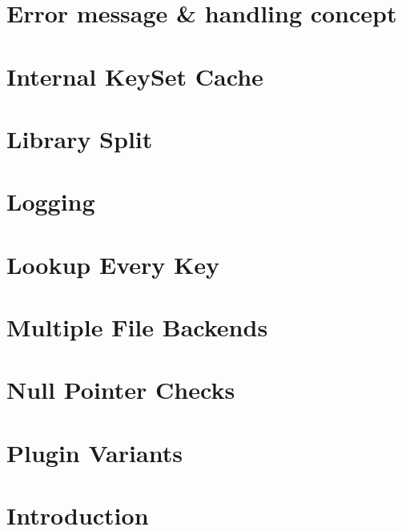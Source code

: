 \documentclass[twoside]{book}
\newcommand{\+}{\discretionary{\mbox{\scriptsize$\hookleftarrow$}}{}{}}
\begin{document}
\chapter{Error message \& handling concept}
\label{doc_decisions_ingroup_removal_md}

\chapter{Internal Key\+Set Cache}
\label{doc_decisions_internal_cache_md}

\chapter{Library Split}
\label{doc_decisions_library_split_md}

\chapter{Logging}
\label{doc_decisions_logging_md}

\chapter{Lookup Every Key}
\label{doc_decisions_lookup_every_key_md}

\chapter{Multiple File Backends}
\label{doc_decisions_multiple_file_backends_md}

\chapter{Null Pointer Checks}
\label{doc_decisions_null_pointer_checks_md}

\chapter{Plugin Variants}
\label{doc_decisions_plugin_variants_md}

\chapter{Introduction}
\label{doc_decisions_README_md}

\end{document}
